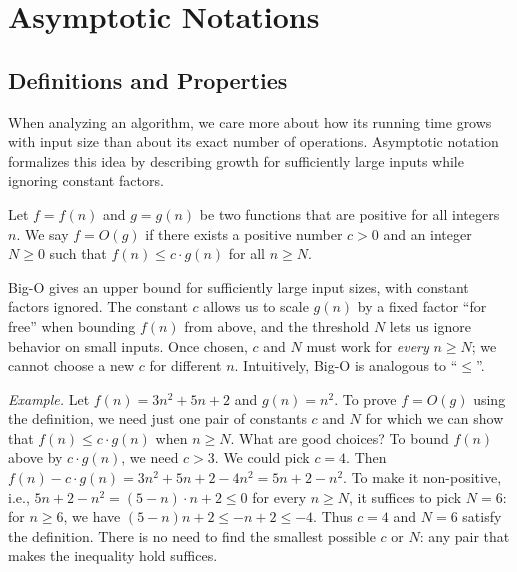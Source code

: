 \setcounter{definition}{0} \setcounter{property}{0} \setcounter{claim}{0} \setcounter{fact}{0} \setcounter{corollary}{0} \setcounter{figure}{0}
\section{Asymptotic Notations}

\subsection*{Definitions and Properties}

When analyzing an algorithm, we care more about how its running time grows with
input size than about its exact number of operations. Asymptotic notation
formalizes this idea by describing growth for sufficiently large inputs while
ignoring constant factors.

\begin{definition}[Big-O]
Let $f = f(n)$ and $g=g(n)$ be two functions that are positive for all integers $n$.
We say $f = O(g)$ if there exists a positive number $c > 0$ and an integer $N \ge 0$
such that $f(n) \le c\cdot g(n)$ for all $n\ge N$.
\end{definition}

Big-O gives an upper bound for sufficiently large input sizes, with constant factors ignored.
The constant $c$ allows us to scale $g(n)$ by a fixed factor ``for free'' when bounding $f(n)$ from above,
and the threshold $N$ lets us ignore behavior on small inputs.
Once chosen, $c$ and $N$ must work for \emph{every} $n\ge N$;
we cannot choose a new $c$ for different $n$.
Intuitively, Big-O is analogous to ``$\le$''.

\emph{Example.} Let $f(n)=3n^2+5n+2$ and $g(n)=n^2$. To prove $f=O(g)$ using the definition,
we need just one pair of constants $c$ and $N$ for which we can show that $f(n) \le c\cdot g(n)$ when $n\ge N$.
What are good choices? To bound $f(n)$ above by $c\cdot g(n)$, we need $c > 3$.
We could pick $c = 4$. Then $f(n) - c\cdot g(n) = 3n^2+5n+2 -4n^2 = 5n+2-n^2$.
To make it non-positive, i.e., $5n+2-n^2 = (5-n)\cdot n + 2\le 0$ for every $n\ge N$,
it suffices to pick $N = 6$: for $n\ge 6$, we have $(5-n)n+2\le -n+2\le -4$.
Thus $c=4$ and $N=6$ satisfy the definition. There is no need to find the
smallest possible $c$ or $N$: any pair that makes the inequality hold suffices.


